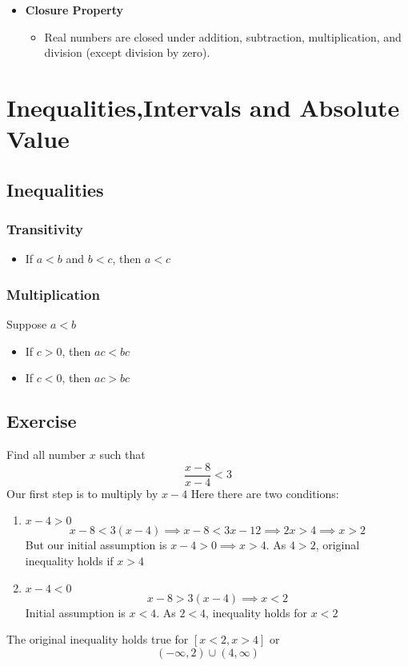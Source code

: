 \begin{itemize}
    \vspace{5pt}
    \item \textbf{Closure Property}
    \begin{itemize}
        \item Real numbers are closed under addition, subtraction, multiplication, and division (except division by zero).
    \end{itemize}
\end{itemize}

\section{Inequalities,Intervals and Absolute Value}
\subsection{Inequalities}
\subsubsection{Transitivity}
\begin{itemize}
    \item If $a < b$ and $b < c$, then $a < c$
    \end{itemize}
\subsubsection{Multiplication}
Suppose $a < b$
\begin{itemize}
    \item If $c > 0$, then $ac < bc$
    \item If $c <  0$, then $ ac > bc$
\end{itemize}

\subsection{Exercise}
Find all number \( x \) such that 
\[\frac{x-8}{x-4} < 3 \]
Our first step  is to multiply by \(x-4\)
Here there are two conditions:
\begin{enumerate}
    \item \( x-4 > 0 \)
    \[ x -8 < 3(x-4)  \implies x-8 < 3x-12 \implies 2x > 4  \implies x > 2\]
    But our initial assumption is \(x-4 > 0 \implies x > 4 \). As \( 4 > 2 \), original inequality holds if \( x > 4\)
    \item \( x-4 < 0 \)
    \[ x-8 > 3(x-4) \implies  x < 2 \]
    Initial assumption is \( x<4 \). As \( 2 < 4\), inequality holds for \( x < 2 \)
\end{enumerate}
The original inequality holds true for \( [x < 2 ,  x > 4 ] \)
or 
\[  (-\infty, 2) \cup (4,\infty) \]

